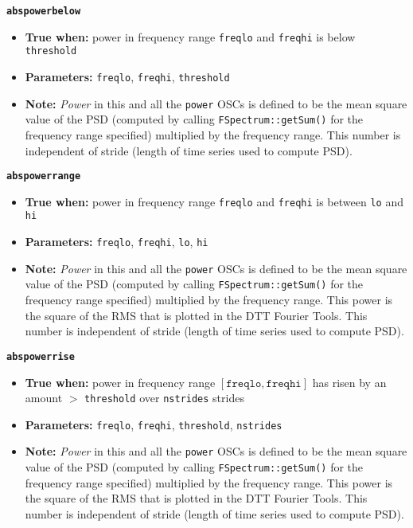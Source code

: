 {{\large\texttt{\textbf{abspowerbelow}}}

\begin{itemize}
\item \textbf{True when:} power in frequency range \texttt{freqlo}
  and \texttt{freqhi} is below \texttt{threshold}
\item \textbf{Parameters:} \texttt{freqlo}, \texttt{freqhi},
  \texttt{threshold}
\item \textbf{Note:} \textit{Power} in this and all the \texttt{power}
  OSCs is defined to be the mean square value of the PSD
  (computed by calling \texttt{FSpectrum::getSum()} for the
  frequency range specified) multiplied by the frequency range.  
  This number is independent of stride (length of time series used to
  compute PSD). 
\end{itemize}


{\large\texttt{\textbf{abspowerrange}}}

\begin{itemize}
\item \textbf{True when:} power in frequency range \texttt{freqlo}
  and \texttt{freqhi} is between \texttt{lo} and \texttt{hi}
\item \textbf{Parameters:} \texttt{freqlo}, \texttt{freqhi},
  \texttt{lo}, \texttt{hi}
\item \textbf{Note:} \textit{Power} in this and all the \texttt{power}
  OSCs is defined to be the mean square value of the PSD
 (computed by calling \texttt{FSpectrum::getSum()} for the
  frequency range specified) multiplied by the frequency range.  This
  power is the square of the RMS that is plotted in the DTT Fourier
  Tools. This number is independent of stride (length of time series
  used to compute PSD). 
\end{itemize}

{\large\texttt{\textbf{abspowerrise}}}
\begin{itemize}
\item \textbf{True when:} power in frequency range
  $[\mathtt{freqlo}, \mathtt{freqhi}]$ has risen by an amount
  $>$ \texttt{threshold} over \texttt{nstrides} strides
\item \textbf{Parameters:} \texttt{freqlo}, \texttt{freqhi},
  \texttt{threshold}, \texttt{nstrides}
\item \textbf{Note:} \textit{Power} in this and all the \texttt{power}
  OSCs is defined to be the mean square value of the PSD
  (computed by calling \texttt{FSpectrum::getSum()} for the
  frequency range specified) multiplied by the frequency range.  This
  power is the square of the RMS that is plotted in the DTT Fourier
  Tools.  This number is independent of stride (length of time series
  used to compute PSD). 
\end{itemize}

}
